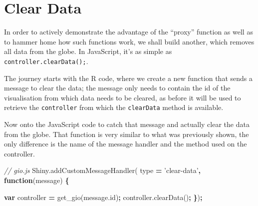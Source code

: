 \documentclass[10pt,]{krantz}
\makeatletter
\newenvironment{Shaded}{\begin{snugshade}}{\end{snugshade}}
\newcommand{\AttributeTok}[1]{\textcolor[rgb]{0.61,0.61,0.61}{#1}}
\newcommand{\CommentTok}[1]{\textcolor[rgb]{0.37,0.37,0.37}{\textit{#1}}}
\newcommand{\ControlFlowTok}[1]{\textcolor[rgb]{0.27,0.27,0.27}{\textbf{#1}}}
\newcommand{\DataTypeTok}[1]{\textcolor[rgb]{0.27,0.27,0.27}{#1}}
\newcommand{\KeywordTok}[1]{\textcolor[rgb]{0.27,0.27,0.27}{\textbf{#1}}}
\newcommand{\NormalTok}[1]{#1}
\newcommand{\OperatorTok}[1]{\textcolor[rgb]{0.43,0.43,0.43}{\textbf{#1}}}
\newcommand{\StringTok}[1]{\textcolor[rgb]{0.5,0.5,0.5}{#1}}
\newcommand{\VariableTok}[1]{\textcolor[rgb]{0,0,0}{#1}}
\newenvironment{kframe}{%
\medskip{}
\setlength{\fboxsep}{.8em}
 \def\at@end@of@kframe{}%
 \ifinner\ifhmode%
  \def\at@end@of@kframe{\end{minipage}}%
  \begin{minipage}{\columnwidth}%
 \fi\fi%
 \def\FrameCommand##1{\hskip\@totalleftmargin \hskip-\fboxsep
 \colorbox{shadecolor}{##1}\hskip-\fboxsep
     \hskip-\linewidth \hskip-\@totalleftmargin \hskip\columnwidth}%
 \MakeFramed {\advance\hsize-\width
   \@totalleftmargin\z@ \linewidth\hsize
   \@setminipage}}%
 {\par\unskip\endMakeFramed%
 \at@end@of@kframe}
\renewenvironment{Shaded}{\begin{kframe}}{\end{kframe}}
\makeatother
\begin{document}
\hypertarget{shiny-widgets-clear-data}{%
\section{Clear Data}\label{shiny-widgets-clear-data}}

In order to actively demonstrate the advantage of the ``proxy'' function as well as to hammer home how such functions work, we shall build another, which removes all data from the globe. In JavaScript, it's as simple as \texttt{controller.clearData();}.

The journey starts with the R code, where we create a new function that sends a message to clear the data; the message only needs to contain the id of the visualisation from which data needs to be cleared, as before it will be used to retrieve the \texttt{controller} from which the \texttt{clearData} method is available.

\begin{Shaded}
\end{Shaded}

Now onto the JavaScript code to catch that message and actually clear the data from the globe. That function is very similar to what was previously shown, the only difference is the name of the message handler and the method used on the controller.

\begin{Shaded}
\begin{Highlighting}[]
\CommentTok{// gio.js}
\VariableTok{Shiny}\NormalTok{.}\AttributeTok{addCustomMessageHandler}\NormalTok{(}
\NormalTok{  type }\OperatorTok{=} \StringTok{'clear-data'}\OperatorTok{,} \KeywordTok{function}\NormalTok{(message) }\OperatorTok{\{}

    \KeywordTok{var}\NormalTok{ controller }\OperatorTok{=} \AttributeTok{get_gio}\NormalTok{(}\VariableTok{message}\NormalTok{.}\AttributeTok{id}\NormalTok{)}\OperatorTok{;}
    \VariableTok{controller}\NormalTok{.}\AttributeTok{clearData}\NormalTok{()}\OperatorTok{;}
\OperatorTok{\}}\NormalTok{)}\OperatorTok{;}
\end{Highlighting}
\end{Shaded}
\end{document}
